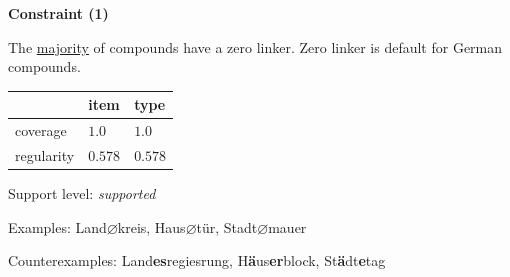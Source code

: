 \documentclass[10pt, a4paper]{article}
\newcommand{\zeroLinker}{\ensuremath{\boldsymbol{\varnothing}}}
\begin{document}
\vspace{0.25em}

\begin{center}
\textbf{Constraint (1)}
\end{center}

\noindent
The \underline{majority} of compounds have a zero linker. Zero linker is default for German compounds.
\vspace{0.35em}


\vspace{-0.35em}

\begin{table}[!ht]

\begin{center}
\begin{tabularx}{\columnwidth}{|X|X|X|}
      \hline
                    & item      & type \\
      \hline
      coverage      & $1.0$      & $1.0$   \\
      \hline
      regularity    & $0.578$      & $0.578$   \\
      \hline
\end{tabularx}
\end{center}
\end{table}

\vspace{-1.35em}


\noindent
Support level: \textit{supported}

\vspace{0.3em}

\noindent
Examples: Land{\zeroLinker}kreis, Haus{\zeroLinker}tür, Stadt{\zeroLinker}mauer

\noindent
Counterexamples: Land\textbf{es}regiesrung, H\textbf{ä}us\textbf{er}block, St\textbf{ä}dt\textbf{e}tag

\vspace{0.3em}
\end{document}
